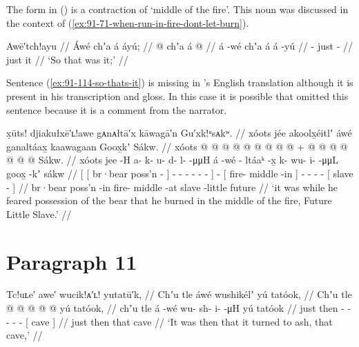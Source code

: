 The form  in (\lastx) is a contraction of  ‘middle of the fire’.
This noun was discussed in the context of (\ref{ex:91-71-when-run-in-fire-dont-let-burn}).

\ex\label{ex:91-114-so-thats-it}%
%
\begingl
	\glpreamble	Awē′tch!ayu //
	\glpreamble	Áwé chʼa á áyú; //
	\gla	{} @ {} chʼa á  @ {} //
	\glb	á -wé chʼa á á -yú //
	\glc	{} - just   - //
	\gld	{} {} just it  {} //
	\glft	‘So that was it;’
		//
\endgl
\xe

Sentence (\ref{ex:91-114-so-thats-it}) is missing in \citeauthor{swanton:1909}’s English translation although it is present in his transcription and gloss.
In this case it is possible that \citeauthor{swanton:1909} omitted this sentence because it is a comment from the narrator.

\ex\label{ex:91-115-fear-bear-burn-up}%
%
\begingl
	\glpreamble	x̣ūts! djiakułxē′ʟ!awe gᴀnᴀłtā′x kāwagā′n Gu′xk!ᵘsᴀkʷ. //
	\glpreamble	xóots jée akoolx̱éitlʼ áwé ganaltáax̱ kaawagaan Goox̱kʼ Sákw. //
	\gla	{} {} xóots  @ {} {}
			 @ {} @ {} @ {} @ {} @ {} @ {} @ {} {}
		 @ {} +
		{}  @ {} @ {} {}
		 @ {} @ {} @ {} @ {}
		{}  @ {} Sákw. {} //
	\glb	{} {} xóots jee -H {}
			a- k- u- d- l-  -μμH {} {}
		á -wé
		{} - ltáaᵏ -x̱ {}
		k- wu- i-  -μμL
		{} goox̱ -kʼ sákw {} //
	\glc	{}[ {}[ br·bear poss’n - {}]
			- - - - -
				 - \· {}]
		 -
		{}[ fire- middle -in {}]
		- - -  -
		{}[ slave -  {}] //
	\gld	{} {} br·bear poss’n -in {}
		 {} {} {} {} {} {} {} {}
		 {}
		{} fire- middle -at {}
		 {} {} {} {}
		{} slave -little future {} //
	\glft	‘it was while he feared possession of the bear
		that he burned in the middle of the fire, Future Little Slave.’
		//
\endgl
\xe

\section{Paragraph 11}\label{sec:91-para-11}

\ex\label{ex:91-116-cave-turn-to-ash}%
%
\begingl
	\glpreamble	Tc!uʟe′ awe′ wucik!ᴀ′ʟ! yutatū′k, //
	\glpreamble	Chʼu tle áwé wushikélʼ yú tatóok, //
	\gla	Chʼu tle  @ {}
		 @ {} @ {} @ {} @ {}
		{} yú tatóok, {} //
	\glb	chʼu tle á -wé
		wu- sh- i-  -μH
		{} yú tatóok {} //
	\glc	just then  -
		- - -  -
		{}[  cave {}] //
	\gld	just then  {}
		 {} {} {} {}
		{} that cave {} //
	\glft	‘It was then that it turned to ash, that cave,’
		//
\endgl
\xe

